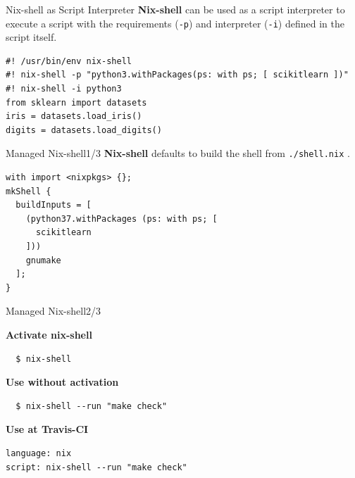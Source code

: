 \documentclass[10pt,aspectratio=169]{beamer}
\begin{document}

\begin{frame}[fragile]{Nix-shell as Script Interpreter}
  \textbf{Nix-shell} can be used as a script interpreter to execute a script with the requirements (\texttt{-p}) and interpreter (\texttt{-i}) defined in the script itself.
  \begin{verbatim}
#! /usr/bin/env nix-shell
#! nix-shell -p "python3.withPackages(ps: with ps; [ scikitlearn ])"
#! nix-shell -i python3
from sklearn import datasets
iris = datasets.load_iris()
digits = datasets.load_digits()
  \end{verbatim}
\end{frame}


\begin{frame}[fragile]{Managed Nix-shell\hfill1/3}
  \textbf{Nix-shell} defaults to build the shell from \texttt{./shell.nix} .
  \begin{verbatim}
with import <nixpkgs> {};
mkShell {
  buildInputs = [
    (python37.withPackages (ps: with ps; [
      scikitlearn
    ]))
    gnumake
  ];
}
  \end{verbatim}
\end{frame}


\begin{frame}[fragile]{Managed Nix-shell\hfill2/3}

  \textbf{Activate nix-shell}
  \begin{verbatim}
  $ nix-shell
  \end{verbatim}

  \textbf{Use without activation}
  \begin{verbatim}
  $ nix-shell --run "make check"
  \end{verbatim}

  \textbf{Use at Travis-CI}
  \begin{verbatim}
language: nix
script: nix-shell --run "make check"
  \end{verbatim}

\end{frame}

\end{document}
